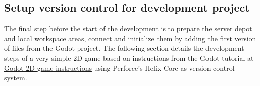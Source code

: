 \subsection{Setup version control for development project} \label{setup-version-control}
The final step before the start of the development is to prepare the server depot and local workspace areas, connect 
and initialize them by adding the first version of files from the Godot project. 
The following section details the development steps of a very simple 2D game based on instructions from the Godot 
tutorial at \href{https://docs.godotengine.org/en/stable/getting_started/first_2d_game/index.html}{\color{blue}Godot 2D game instructions}
using Perforce's Helix Core as version control system.
